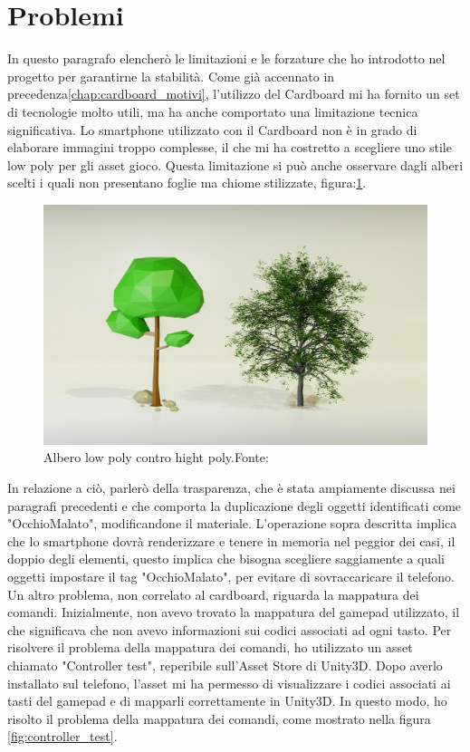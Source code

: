 \documentclass[
a4paper,
cleardoublepage=empty,
headings=twolinechapter,
numbers=autoenddot,
]{scrbook}
\begin{document}
    \section{Problemi}
    In questo paragrafo elencherò le limitazioni e le forzature che ho introdotto nel progetto per garantirne la stabilità. Come già accennato in precedenza\ref{chap:cardboard_motivi}, l'utilizzo del Cardboard mi ha fornito un set di tecnologie molto utili, ma ha anche comportato una limitazione tecnica significativa. Lo smartphone utilizzato con il Cardboard non è in grado di elaborare immagini troppo complesse, il che mi ha costretto a scegliere uno stile low poly per gli asset  gioco.
    Questa limitazione si può anche osservare dagli alberi scelti i quali non presentano foglie ma chiome stilizzate, figura:\ref{fig:low_hight}.
    \begin{figure}[h]
		\centering
		\includegraphics[width=0.6\linewidth]{image/low_hight}
		\caption{Albero low poly contro hight poly.Fonte:\cite{low_high}}
		\label{fig:low_hight}
    \end{figure}
    In relazione a ciò, parlerò della trasparenza, che è stata ampiamente discussa nei paragrafi precedenti e che comporta la duplicazione degli oggetti identificati come "OcchioMalato", modificandone il materiale.
    L'operazione sopra descritta implica che lo smartphone dovrà renderizzare e tenere in memoria nel peggior dei casi, il doppio degli elementi, questo implica che bisogna scegliere saggiamente a quali oggetti impostare il tag "OcchioMalato", per evitare di sovraccaricare il telefono.
    Un altro problema, non correlato al cardboard, riguarda la mappatura dei comandi. Inizialmente, non avevo trovato la mappatura del gamepad utilizzato, il che significava che non avevo informazioni sui codici associati ad ogni tasto.
    Per risolvere il problema della mappatura dei comandi, ho utilizzato un asset chiamato "Controller test"\cite{Controller_test}, reperibile sull'Asset Store di Unity3D. Dopo averlo installato sul telefono, l'asset mi ha permesso di visualizzare i codici associati ai tasti del gamepad e di mapparli correttamente in Unity3D. In questo modo, ho risolto il problema della mappatura dei comandi, come mostrato nella figura \ref{fig:controller_test}.
\end{document}

